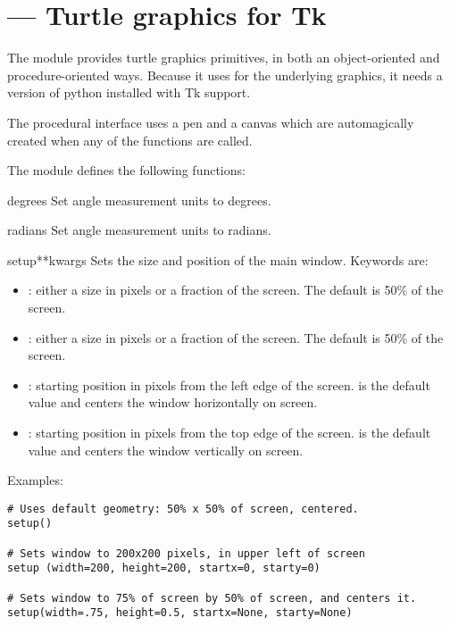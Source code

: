 \section{ ---
         Turtle graphics for Tk}




The  module provides turtle graphics primitives, in both an
object-oriented and procedure-oriented ways. Because it uses 
for the underlying graphics, it needs a version of python installed with
Tk support.

The procedural interface uses a pen and a canvas which are automagically
created when any of the functions are called.

The  module defines the following functions:

\begin{funcdesc}{degrees}{}
Set angle measurement units to degrees.
\end{funcdesc}

\begin{funcdesc}{radians}{}
Set angle measurement units to radians.
\end{funcdesc}

\begin{funcdesc}{setup}{**kwargs}
Sets the size and position of the main window.  Keywords are:
\begin{itemize}
  \item {}: either a size in pixels or a fraction of the screen.
   The default is 50\% of the screen.
  \item {}: either a size in pixels or a fraction of the screen.
   The default is 50\% of the screen.
  \item {}: starting position in pixels from the left edge
      of the screen.  is the default value and 
      centers the window horizontally on screen.
  \item {}: starting position in pixels from the top edge
      of the screen.  is the default value and 
      centers the window vertically on screen.
\end{itemize}

   Examples:

\begin{verbatim}
# Uses default geometry: 50% x 50% of screen, centered.
setup()  

# Sets window to 200x200 pixels, in upper left of screen
setup (width=200, height=200, startx=0, starty=0)

# Sets window to 75% of screen by 50% of screen, and centers it.
setup(width=.75, height=0.5, startx=None, starty=None)
\end{verbatim}

\end{funcdesc}

